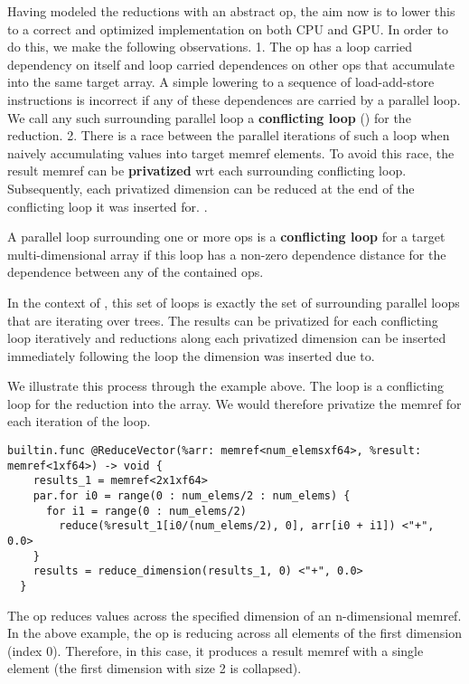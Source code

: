 Having modeled the reductions with an abstract op, the 
aim now is to lower this to a correct and optimized 
implementation on both CPU and GPU. In order to do this,
we make the following observations. 
1. The  op has a loop carried dependency on itself
and loop carried dependences on other  ops that
accumulate into the same target array. 
A simple lowering to a sequence of load-add-store instructions is 
incorrect if any of these dependences are carried by a parallel 
loop. We call any such surrounding parallel loop a 
\textbf{conflicting loop} () for the reduction.
2. There is a race between the parallel iterations of such a loop 
when naively accumulating values into target memref elements. 
To avoid this race, the result memref can be \textbf{privatized} wrt each 
surrounding conflicting loop. Subsequently, each privatized dimension 
can be reduced at the end of the conflicting loop it was inserted for. 
 .


\begin{definition}
A parallel loop surrounding one or more  ops is 
a \textbf{conflicting loop} for a target multi-dimensional array if this 
loop has a non-zero dependence distance for the dependence between
any of the contained  ops.
\end{definition} 

In the context of \Treebeard{}, this set of loops is exactly the set 
of surrounding parallel loops that are iterating over trees. The 
results can be privatized for each conflicting loop iteratively 
and reductions along each privatized dimension can be inserted  
immediately following the loop the dimension was inserted due to.

We illustrate this process through the example above. The  loop is 
a conflicting loop for the reduction into the  array.
We would therefore privatize the  memref for each iteration of 
the  loop. 
\begin{lstlisting}[style=c++]
  builtin.func @ReduceVector(%arr: memref<num_elemsxf64>, %result: memref<1xf64>) -> void {
    results_1 = memref<2x1xf64>
    par.for i0 = range(0 : num_elems/2 : num_elems) {
      for i1 = range(0 : num_elems/2) 
        reduce(%result_1[i0/(num_elems/2), 0], arr[i0 + i1]) <"+", 0.0>
    }
    results = reduce_dimension(results_1, 0) <"+", 0.0>
  }
\end{lstlisting}
The op  reduces values across the specified
dimension of an n-dimensional memref. In the above example, 
the  op is reducing across all elements 
of the first dimension (index 0). Therefore, in this case, it 
produces a result memref with a single element (the first dimension
with size 2 is collapsed). 


